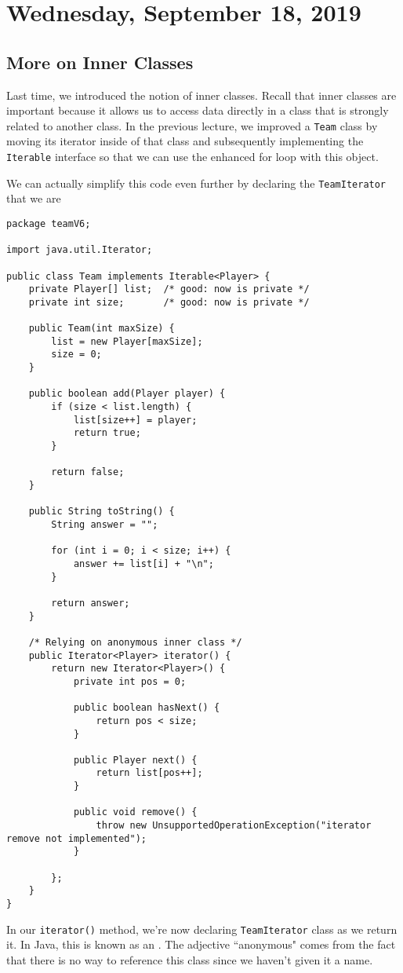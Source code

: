 \section{Wednesday, September 18, 2019}
\subsection{More on Inner Classes}
Last time, we introduced the notion of inner classes. Recall that inner classes are important because it allows us to access data directly in a class that is strongly related to another class. In the previous lecture, we improved a \verb!Team! class by moving its iterator inside of that class and subsequently implementing the \verb!Iterable! interface so that we can use the enhanced for loop with this object. 

We can actually simplify this code even further by declaring the \verb!TeamIterator! that we are 

\begin{lstlisting}
package teamV6;

import java.util.Iterator;

public class Team implements Iterable<Player> {
	private Player[] list;  /* good: now is private */
	private int size;	    /* good: now is private */
	
	public Team(int maxSize) {
		list = new Player[maxSize];
		size = 0;
	}
	
	public boolean add(Player player) {
		if (size < list.length) {
			list[size++] = player;
			return true;
		}
		
		return false;
	}
	
	public String toString() {
		String answer = "";
		
		for (int i = 0; i < size; i++) { 
			answer += list[i] + "\n";
		}
		
		return answer;
	}

	/* Relying on anonymous inner class */
	public Iterator<Player> iterator() {
		return new Iterator<Player>() {
			private int pos = 0;
			
			public boolean hasNext() {
				return pos < size;
			}
			
			public Player next() {
				return list[pos++];
			}
			
			public void remove() {
				throw new UnsupportedOperationException("iterator remove not implemented");
			}
			
		};
	}
}
\end{lstlisting}
In our \verb!iterator()! method, we're now declaring \verb!TeamIterator! class as we return it. In Java, this is known as an . The adjective ``anonymous" comes from the fact that there is no way to reference this class since we haven't given it a name. 

